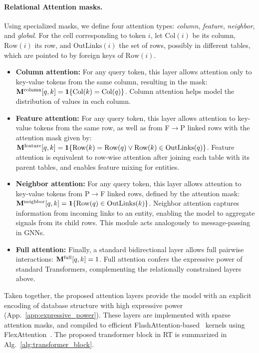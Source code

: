 \paragraph{Relational Attention masks.}
Using specialized masks, we define four attention types: \emph{column}, \emph{feature}, \emph{neighbor}, and \emph{global}. For the cell corresponding to token $i$, let $\text{Col}(i)$ be its column, $\text{Row}(i)$ its row, and $\text{OutLinks}(i)$ the set of rows,
possibly in different tables,
which are pointed to by foreign keys of $\text{Row}(i)$.
\begin{itemize}
\item \textbf{Column attention:}
For any query token,
this layer allows attention only to key-value tokens from the same column, resulting in the mask: ${\mathbf{M}}^{\text{column}}[q, k] = {\mathbf{1}}\{\text{Col}(k) = \text{Col}(q)\}$. Column attention helps model the distribution of values in each column.

\item \textbf{Feature attention:}
For any query token,
this layer allows attention to key-value tokens from the same row,
as well as from F$\to$P linked rows with the attention mask given by: ${\mathbf{M}}^{\text{feature}}[q, k] = {\mathbf{1}}\{
\text{Row}(k) = \text{Row}(q) \lor \text{Row}(k) \in \text{OutLinks}(q)
\}$. Feature attention is equivalent to row-wise attention
after joining each table with its parent tables,
and enables feature mixing for entities.

\item \textbf{Neighbor attention:}
For any query token, 
this layer allows attention to key-value tokens from P$\to$F linked rows, defined by the attention mask: ${\mathbf{M}}^{\text{neighbor}}[q, k] = {\mathbf{1}}\{\text{Row}(q) \in \text{OutLinks}(k)\}$. Neighbor attention captures information from incoming links to an entity, enabling the model to aggregate signals from its child rows. This module acts analogously to message-passing in GNNs.


\item \textbf{Full attention:}
Finally, a standard bidirectional layer allows full pairwise interactions: ${\mathbf{M}}^{\text{full}}[q,k] = 1$. Full attention confers the expressive power of standard Transformers, complementing the relationally constrained layers above.
\end{itemize}

Taken together, the proposed attention layers provide the model with an explicit encoding of database structure
with high expressive power (App.~\ref{app:expressive_power}). These layers are implemented with sparse attention masks,
and compiled to efficient FlashAttention-based~\citep{flash_attention} kernels
using FlexAttention~\citep{flex_attention}. 
The proposed transformer block in RT is summarized in Alg.~\ref{alg:transformer_block}.

